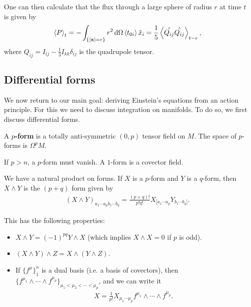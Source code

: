 
One can then calculate that the flux through a large sphere of radius $r$ at time $t$ is given by
\begin{align}
    \left<P \right>_t = - \int_{\{\left| \vb{x} \right| = r\} } r^2 \dd{\Omega} \left<t_{0i} \right> \hat{x}_{i} = \frac{1}{5} \left< \dot{\ddot{Q_{ij}}} \dot{\ddot{Q_{ij}}} \right>_{t - r}
,\end{align}
where $Q_{ij} = I_{ij} - \frac{1}{3} I_{kk} \delta_{ij}$ is the quadrupole tensor.

\subsection{Differential forms}

We now return to our main goal: deriving Einstein's equations from an action principle. For this we need to discuss integration on manifolds. To do so, we first discuss differential forms.

\begin{definition}
    A \textbf{$p$-form} is a totally anti-symmetric $\left( 0,p \right) $ tensor field on $M$. The space of $p$-forms is $\Omega^{p} M$.
\end{definition}

\begin{note}
    If $p > n$, a $p$-form must vanish. A $1$-form is a covector field.
\end{note}

We have a natural product on forms. If $X$ is a $p$-form and $Y$ is a $q$-form, then $X \wedge Y$ is the $\left( p + q \right) $ form given by
\begin{align}
    \left( X \wedge Y \right)_{a_1 \cdots a_{p} b_1 \cdots b_q} = \frac{\left( p + q \right)!}{p! q!} X_{[a_1 \cdots a_p} Y_{b_1 \cdots b_q]}
.\end{align}

This has the following properties:
\begin{itemize}
    \item $X \wedge Y  = \left( -1 \right)^{pq} Y \wedge X$ (which implies $X \wedge X = 0$ if $p$ is odd).
    \item $\left( X \wedge Y \right)  \wedge Z = X \wedge \left( Y \wedge Z \right)$.
    \item If $\{f^{\mu}\}_{1}^{n}$ is a dual basis (i.e. a basis of covectors), then $\{f^{\mu_1} \wedge \cdots \wedge f^{\mu_p}\}_{\mu_1 < \mu_2 < \cdots < \mu_p}$, and we can write it
        \begin{align}
            X = \frac{1}{p!} X_{\mu_1 \cdots \mu_p} f^{\mu_1} \wedge \cdots \wedge f^{\mu_p}
        .\end{align}
\end{itemize}

